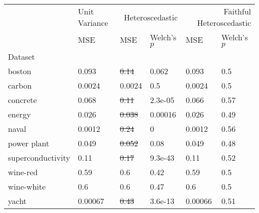 \begin{tabular}{l|l|ll|ll}
\toprule
 & Unit Variance & \multicolumn{2}{r}{Heteroscedastic} & \multicolumn{2}{r}{Faithful Heteroscedastic} \\
 & MSE & MSE & Welch's $p$ & MSE & Welch's $p$ \\
Dataset &  &  &  &  &  \\
\midrule
boston & 0.093 & \sout{0.14} & 0.062 & 0.093 & 0.5 \\
carbon & 0.0024 & 0.0024 & 0.5 & 0.0024 & 0.5 \\
concrete & 0.068 & \sout{0.11} & 2.3e-05 & 0.066 & 0.57 \\
energy & 0.026 & \sout{0.038} & 0.00016 & 0.026 & 0.49 \\
naval & 0.0012 & \sout{0.24} & 0 & 0.0012 & 0.56 \\
power plant & 0.049 & \sout{0.052} & 0.08 & 0.049 & 0.48 \\
superconductivity & 0.11 & \sout{0.17} & 9.3e-43 & 0.11 & 0.52 \\
wine-red & 0.59 & 0.6 & 0.42 & 0.59 & 0.5 \\
wine-white & 0.6 & 0.6 & 0.47 & 0.6 & 0.5 \\
yacht & 0.00067 & \sout{0.43} & 3.6e-13 & 0.00066 & 0.51 \\
\bottomrule
\end{tabular}
